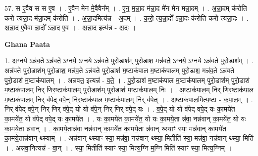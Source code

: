 \documentclass[17pt]{extarticle}
\begin{document}
57. स ए॒वैव स स ए॒व । . ए॒वैन॑ मेन मे॒वैवैन᳚म् । . ए॒न॒ म॒न्ना॒द म॑न्ना॒द मे॑न मेन मन्ना॒दम् । . अ॒न्ना॒दम् क॑रोति करो त्यन्ना॒द म॑न्ना॒दम् क॑रोति । . अ॒न्ना॒दमित्य॑न्न - अ॒दम् । . क॒रो॒ त्य॒न्ना॒दो᳚ ऽन्ना॒दः क॑रोति करो त्यन्ना॒दः । . अ॒न्ना॒द ए॒वैवा न्ना॒दो᳚ ऽन्ना॒द ए॒व । . अ॒न्ना॒द इत्य॑न्न - अ॒दः । \newline

\textbf{Ghana Paata } \newline

1. अ॒ग्नये ऽन्न॑व॒ते ऽन्न॑वते॒ ऽग्नये॒ ऽग्नये ऽन्न॑वते पुरो॒डाश॑म् पुरो॒डाश॒ मन्न॑वते॒ ऽग्नये॒ ऽग्नये ऽन्न॑वते पुरो॒डाश᳚म् । . अन्न॑वते पुरो॒डाश॑म् पुरो॒डाश॒ मन्न॑व॒ते ऽन्न॑वते पुरो॒डाश॑ म॒ष्टाक॑पाल म॒ष्टाक॑पालम् पुरो॒डाश॒ मन्न॑व॒ते ऽन्न॑वते पुरो॒डाश॑ म॒ष्टाक॑पालम् । . अन्न॑वत॒ इत्यन्न॑ - व॒ते॒ । . पु॒रो॒डाश॑ म॒ष्टाक॑पाल म॒ष्टाक॑पालम् पुरो॒डाश॑म् पुरो॒डाश॑ म॒ष्टाक॑पाल॒म् निर् णिर॒ष्टाक॑पालम् पुरो॒डाश॑म् पुरो॒डाश॑ म॒ष्टाक॑पाल॒म् निः । . अ॒ष्टाक॑पाल॒म् निर् णिर॒ष्टाक॑पाल म॒ष्टाक॑पाल॒म् निर् व॑पेद् वपे॒न् निर॒ष्टाक॑पाल म॒ष्टाक॑पाल॒म् निर् व॑पेत् । . अ॒ष्टाक॑पाल॒मित्य॒ष्टा - क॒पा॒ल॒म् । . निर् व॑पेद् वपे॒न् निर् णिर् व॑पे॒द् यो यो व॑पे॒न् निर् णिर् व॑पे॒द् यः । . व॒पे॒द् यो यो व॑पेद् वपे॒द् यः का॒मये॑त का॒मये॑त॒ यो व॑पेद् वपे॒द् यः का॒मये॑त । . यः का॒मये॑त का॒मये॑त॒ यो यः का॒मये॒ता न्न॑वा॒ नन्न॑वान् का॒मये॑त॒ यो यः का॒मये॒ता न्न॑वान् । . का॒मये॒तान्न॑वा॒ नन्न॑वान् का॒मये॑त का॒मये॒ता न्न॑वान् थ्स्याꣳ स्या॒ मन्न॑वान् का॒मये॑त का॒मये॒तान्न॑वान् थ्स्याम् । . अन्न॑वान् थ्स्याꣳ स्या॒ मन्न॑वा॒ नन्न॑वान् थ्स्या॒ मितीति॑ स्या॒ मन्न॑वा॒ नन्न॑वान् थ्स्या॒ मिति॑ । . अन्न॑वा॒नित्यन्न॑ - वा॒न् । . स्या॒ मितीति॑ स्याꣳ स्या॒ मित्य॒ग्नि म॒ग्नि मिति॑ स्याꣳ स्या॒ मित्य॒ग्निम् । \newline
\end{document}
